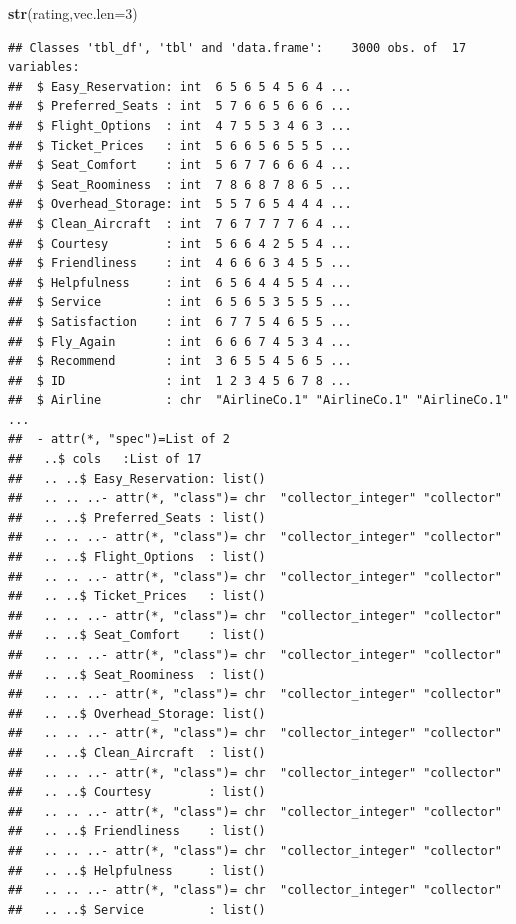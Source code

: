 \documentclass[12pt,]{krantz}
\newenvironment{Shaded}{\begin{snugshade}}{\end{snugshade}}
\newcommand{\KeywordTok}[1]{\textcolor[rgb]{0.13,0.29,0.53}{\textbf{#1}}}
\newcommand{\DataTypeTok}[1]{\textcolor[rgb]{0.13,0.29,0.53}{#1}}
\newcommand{\DecValTok}[1]{\textcolor[rgb]{0.00,0.00,0.81}{#1}}
\newcommand{\NormalTok}[1]{#1}
\theoremstyle{definition}
\theoremstyle{definition}
\theoremstyle{definition}
\theoremstyle{remark}
\begin{document}
\begin{Shaded}
\begin{Highlighting}[]
\KeywordTok{str}\NormalTok{(rating,}\DataTypeTok{vec.len=}\DecValTok{3}\NormalTok{)}
\end{Highlighting}
\end{Shaded}

\begin{verbatim}
## Classes 'tbl_df', 'tbl' and 'data.frame':    3000 obs. of  17 variables:
##  $ Easy_Reservation: int  6 5 6 5 4 5 6 4 ...
##  $ Preferred_Seats : int  5 7 6 6 5 6 6 6 ...
##  $ Flight_Options  : int  4 7 5 5 3 4 6 3 ...
##  $ Ticket_Prices   : int  5 6 6 5 6 5 5 5 ...
##  $ Seat_Comfort    : int  5 6 7 7 6 6 6 4 ...
##  $ Seat_Roominess  : int  7 8 6 8 7 8 6 5 ...
##  $ Overhead_Storage: int  5 5 7 6 5 4 4 4 ...
##  $ Clean_Aircraft  : int  7 6 7 7 7 7 6 4 ...
##  $ Courtesy        : int  5 6 6 4 2 5 5 4 ...
##  $ Friendliness    : int  4 6 6 6 3 4 5 5 ...
##  $ Helpfulness     : int  6 5 6 4 4 5 5 4 ...
##  $ Service         : int  6 5 6 5 3 5 5 5 ...
##  $ Satisfaction    : int  6 7 7 5 4 6 5 5 ...
##  $ Fly_Again       : int  6 6 6 7 4 5 3 4 ...
##  $ Recommend       : int  3 6 5 5 4 5 6 5 ...
##  $ ID              : int  1 2 3 4 5 6 7 8 ...
##  $ Airline         : chr  "AirlineCo.1" "AirlineCo.1" "AirlineCo.1" ...
##  - attr(*, "spec")=List of 2
##   ..$ cols   :List of 17
##   .. ..$ Easy_Reservation: list()
##   .. .. ..- attr(*, "class")= chr  "collector_integer" "collector"
##   .. ..$ Preferred_Seats : list()
##   .. .. ..- attr(*, "class")= chr  "collector_integer" "collector"
##   .. ..$ Flight_Options  : list()
##   .. .. ..- attr(*, "class")= chr  "collector_integer" "collector"
##   .. ..$ Ticket_Prices   : list()
##   .. .. ..- attr(*, "class")= chr  "collector_integer" "collector"
##   .. ..$ Seat_Comfort    : list()
##   .. .. ..- attr(*, "class")= chr  "collector_integer" "collector"
##   .. ..$ Seat_Roominess  : list()
##   .. .. ..- attr(*, "class")= chr  "collector_integer" "collector"
##   .. ..$ Overhead_Storage: list()
##   .. .. ..- attr(*, "class")= chr  "collector_integer" "collector"
##   .. ..$ Clean_Aircraft  : list()
##   .. .. ..- attr(*, "class")= chr  "collector_integer" "collector"
##   .. ..$ Courtesy        : list()
##   .. .. ..- attr(*, "class")= chr  "collector_integer" "collector"
##   .. ..$ Friendliness    : list()
##   .. .. ..- attr(*, "class")= chr  "collector_integer" "collector"
##   .. ..$ Helpfulness     : list()
##   .. .. ..- attr(*, "class")= chr  "collector_integer" "collector"
##   .. ..$ Service         : list()

\end{verbatim}
\end{document}
